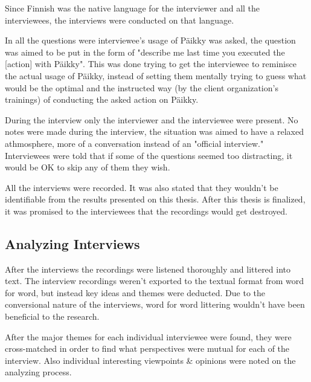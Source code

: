Since Finnish was the native language for the interviewer and all the interviewees, the interviews were conducted on that language.

In all the questions were interviewee's usage of Päikky was asked, the question was aimed to be put in the form of "describe me last time you executed the [action] with Päikky". This was done trying to get the interviewee to reminisce the actual usage of Päikky, instead of setting them mentally trying to guess what would be the optimal and the instructed way (by the client organization's trainings) of conducting the asked action on Päikky.

During the interview only the interviewer and the interviewee were present. No notes were made during the interview, the situation was aimed to have a relaxed athmosphere, more of a conversation instead of an "official interview." Interviewees were told that if some of the questions seemed too distracting, it would be OK to skip any of them they wish.

All the interviews were recorded.  It was also stated that they wouldn't be identifiable from the results presented on this thesis. After this thesis is finalized, it was promised to the interviewees that the recordings would get destroyed.



\subsection{Analyzing Interviews}

After the interviews the recordings were listened thoroughly and littered into text. The interview recordings weren't exported to the textual format from word for word, but instead key ideas and themes were deducted. Due to the conversional nature of the interviews, word for word littering wouldn't have been beneficial to the research. 

After the major themes for each individual interviewee were found, they were cross-matched in order to find what perspectives were mutual for each of the interview. Also individual interesting viewpoints & opinions were noted on the analyzing process.




